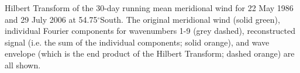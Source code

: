\label{fig:example_hilbert}
Hilbert Transform of the 30-day running mean meridional wind for 22 May 1986 and 29 July 2006 at 54.75$^{\circ}$South. The original meridional wind (solid green), individual Fourier components for wavenumbers 1-9 (grey dashed), reconstructed signal (i.e. the sum of the individual components; solid orange), and wave envelope (which is the end product of the Hilbert Transform; dashed orange) are all shown. 
